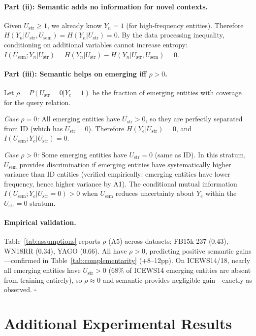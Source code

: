 \documentclass{article}
\begin{document}
\paragraph{Part (ii): Semantic adds no information for novel contexts.}
Given $U_{\text{str}} \geq 1$, we already know $Y_n = 1$ (for high-frequency entities). Therefore $H(Y_n | U_{\text{str}}, U_{\text{sem}}) = H(Y_n | U_{\text{str}}) = 0$. By the data processing inequality, conditioning on additional variables cannot increase entropy: $I(U_{\text{sem}}; Y_n | U_{\text{str}}) = H(Y_n | U_{\text{str}}) - H(Y_n | U_{\text{str}}, U_{\text{sem}}) = 0$.

\paragraph{Part (iii): Semantic helps on emerging iff $\rho > 0$.}
Let $\rho = P(U_{\text{str}} = 0 | Y_e = 1)$ be the fraction of emerging entities with coverage for the query relation.

\emph{Case $\rho = 0$:} All emerging entities have $U_{\text{str}} > 0$, so they are perfectly separated from ID (which has $U_{\text{str}} = 0$). Therefore $H(Y_e | U_{\text{str}}) = 0$, and $I(U_{\text{sem}}; Y_e | U_{\text{str}}) = 0$.

\emph{Case $\rho > 0$:} Some emerging entities have $U_{\text{str}} = 0$ (same as ID). In this stratum, $U_{\text{sem}}$ provides discrimination if emerging entities have systematically higher variance than ID entities (verified empirically: emerging entities have lower frequency, hence higher variance by A1). The conditional mutual information $I(U_{\text{sem}}; Y_e | U_{\text{str}} = 0) > 0$ when $U_{\text{sem}}$ reduces uncertainty about $Y_e$ within the $U_{\text{str}} = 0$ stratum.

\paragraph{Empirical validation.}
Table~\ref{tab:assumptions} reports $\rho$ (A5) across datasets: FB15k-237 (0.43), WN18RR (0.34), YAGO (0.66). All have $\rho > 0$, predicting positive semantic gains---confirmed in Table~\ref{tab:complementarity} (+8--12pp). On ICEWS14/18, nearly all emerging entities have $U_{\text{str}} > 0$ (68\% of ICEWS14 emerging entities are absent from training entirely), so $\rho \approx 0$ and semantic provides negligible gain---exactly as observed. $\square$

\section{Additional Experimental Results}
\label{app:experiments}
\end{document}
